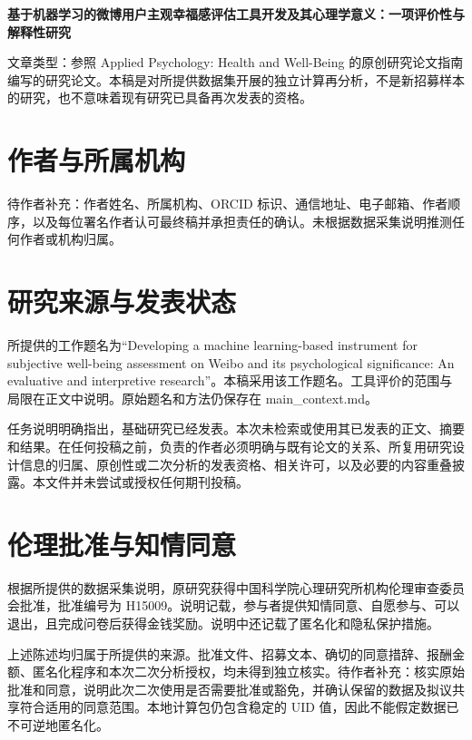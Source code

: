 \documentclass[11pt,letterpaper]{article}
\begin{document}
\begin{center}\fontsize{16}{20}\selectfont\bfseries 基于机器学习的微博用户主观幸福感评估工具开发及其心理学意义：一项评价性与解释性研究\end{center}
文章类型：参照 Applied Psychology: Health and Well-Being 的原创研究论文指南编写的研究论文。本稿是对所提供数据集开展的独立计算再分析，不是新招募样本的研究，也不意味着现有研究已具备再次发表的资格。

\section{作者与所属机构}\label{ux4f5cux8005ux4e0eux6240ux5c5eux673aux6784}

待作者补充：作者姓名、所属机构、ORCID 标识、通信地址、电子邮箱、作者顺序，以及每位署名作者认可最终稿并承担责任的确认。未根据数据采集说明推测任何作者或机构归属。

\section{研究来源与发表状态}\label{ux7814ux7a76ux6765ux6e90ux4e0eux53d1ux8868ux72b6ux6001}

所提供的工作题名为``Developing a machine learning-based instrument for subjective well-being assessment on Weibo and its psychological significance: An evaluative and interpretive research''。本稿采用该工作题名。工具评价的范围与局限在正文中说明。原始题名和方法仍保存在 main\_\allowbreak{}context.md。

任务说明明确指出，基础研究已经发表。本次未检索或使用其已发表的正文、摘要和结果。在任何投稿之前，负责的作者必须明确与既有论文的关系、所复用研究设计信息的归属、原创性或二次分析的发表资格、相关许可，以及必要的内容重叠披露。本文件并未尝试或授权任何期刊投稿。

\section{伦理批准与知情同意}\label{ux4f26ux7406ux6279ux51c6ux4e0eux77e5ux60c5ux540cux610f}

根据所提供的数据采集说明，原研究获得中国科学院心理研究所机构伦理审查委员会批准，批准编号为 H15009。说明记载，参与者提供知情同意、自愿参与、可以退出，且完成问卷后获得金钱奖励。说明中还记载了匿名化和隐私保护措施。

上述陈述均归属于所提供的来源。批准文件、招募文本、确切的同意措辞、报酬金额、匿名化程序和本次二次分析授权，均未得到独立核实。待作者补充：核实原始批准和同意，说明此次二次使用是否需要批准或豁免，并确认保留的数据及拟议共享符合适用的同意范围。本地计算包仍包含稳定的 UID 值，因此不能假定数据已不可逆地匿名化。
\end{document}
